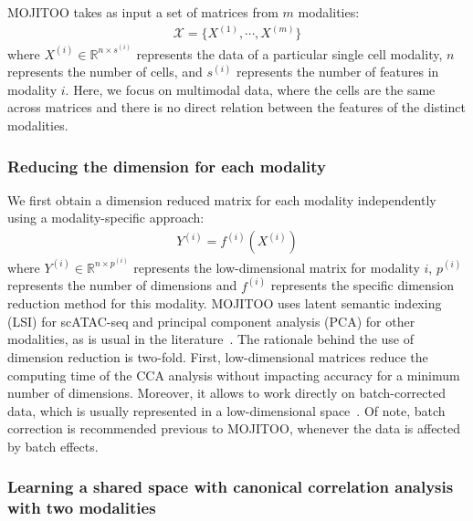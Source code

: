 MOJITOO takes as input a set of matrices from $m$ modalities:
\begin{align}
    \mathcal{X}=\{X^{(1)},\cdots,X^{(m)}\}
\end{align}
where $X^{(i)} \in \mathbb{R}^{n\times s^{(i)}}$ represents the data of a particular single cell modality, $n$ represents the number of cells, and $s^{(i)}$ represents the number of features in modality $i$. Here, we focus on multimodal data, where the cells are the same across matrices and there is no direct relation between the features of the distinct modalities. 

\subsubsection{Reducing the dimension for each modality}

We first obtain a dimension reduced matrix for each modality independently using a modality-specific approach: 
\begin{align}
    Y^{(i)}=f^{(i)}(X^{(i)})
\end{align}
where $Y^{(i)} \in \mathbb{R}^{n\times p^{(i)}}$ represents the low-dimensional matrix for modality $i$, $p^{(i)}$ represents the number of dimensions and $f^{(i)}$ represents the specific dimension reduction method for this modality. MOJITOO uses latent semantic indexing (LSI) for scATAC-seq and principal component analysis (PCA) for other modalities, as is usual in the literature~\cite{granja2021archr, signac, hao2021integrated}.
The rationale behind the use of dimension reduction is two-fold. First, low-dimensional matrices reduce the computing time of the CCA analysis without impacting accuracy for a minimum number of dimensions. Moreover, it allows to work directly on batch-corrected data, which is usually represented in a low-dimensional space~\cite{hao2021integrated, korsunsky2019fast}. Of note, batch correction is recommended previous to MOJITOO, whenever the data is affected by batch effects. 

\subsubsection{Learning a shared space with canonical correlation analysis with two modalities}

